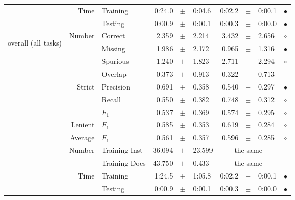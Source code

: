 \begin{longtable}{|r|r|l||rcl|rcl|c|}
\cline{2-10} & \multirow{2}{*}{      Time} &        Training &      0:24.0 &  $\pm$  &      0:04.6 &      0:02.2 &  $\pm$  &      0:00.1 & $\bullet$ \\
\cline{3-10} &                             &         Testing &      0:00.9 &  $\pm$  &      0:00.1 &      0:00.3 &  $\pm$  &      0:00.0 & $\bullet$ \\
\hline
\hline
\multirow{11}{*}{\begin{sideways}overall (all tasks)\end{sideways} }
             & \multirow{4}{*}{    Number} &         Correct &       2.359 &  $\pm$  &       2.214 &       3.432 &  $\pm$  &       2.656 & $\circ$ \\
\cline{3-10} &                             &         Missing &       1.986 &  $\pm$  &       2.172 &       0.965 &  $\pm$  &       1.316 & $\bullet$ \\
\cline{3-10} &                             &        Spurious &       1.240 &  $\pm$  &       1.823 &       2.711 &  $\pm$  &       2.294 & $\circ$ \\
\cline{3-10} &                             &         Overlap &       0.373 &  $\pm$  &       0.913 &       0.322 &  $\pm$  &       0.713 &  \\
\cline{2-10} & \multirow{3}{*}{    Strict} &       Precision &       0.691 &  $\pm$  &       0.358 &       0.540 &  $\pm$  &       0.297 & $\bullet$ \\
\cline{3-10} &                             &          Recall &       0.550 &  $\pm$  &       0.382 &       0.748 &  $\pm$  &       0.312 & $\circ$ \\
\cline{3-10} &                             &           $F_1$ &       0.537 &  $\pm$  &       0.369 &       0.574 &  $\pm$  &       0.295 & $\circ$ \\
\cline{2-10} &                     Lenient &           $F_1$ &       0.585 &  $\pm$  &       0.353 &       0.619 &  $\pm$  &       0.284 & $\circ$ \\
\cline{2-10} &                     Average &           $F_1$ &       0.561 &  $\pm$  &       0.357 &       0.596 &  $\pm$  &       0.285 & $\circ$ \\
\cline{2-10} & \multirow{2}{*}{    Number} &   Training Inst &      36.094 &  $\pm$  &      23.599 &    \multicolumn{3}{c|}{the same}         &  \\
\cline{3-10} &                             &   Training Docs &      43.750 &  $\pm$  &       0.433 &    \multicolumn{3}{c|}{the same}         &  \\
\cline{2-10} & \multirow{2}{*}{      Time} &        Training &      1:24.5 &  $\pm$  &      1:05.8 &      0:02.2 &  $\pm$  &      0:00.1 & $\bullet$ \\
\cline{3-10} &                             &         Testing &      0:00.9 &  $\pm$  &      0:00.1 &      0:00.3 &  $\pm$  &      0:00.0 & $\bullet$ \\
\hline
\end{longtable}

